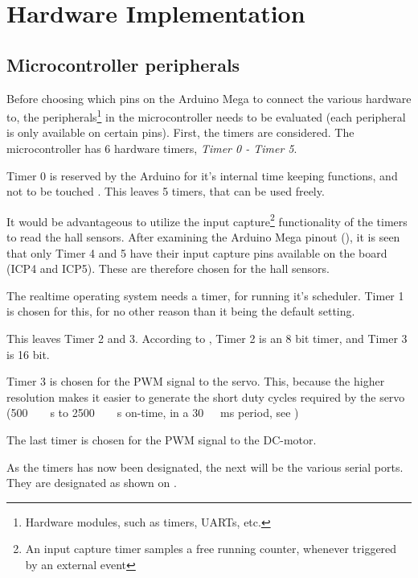 \section{Hardware Implementation}
\subsection{Microcontroller peripherals}
Before choosing which pins on the Arduino Mega to connect the various hardware to, the peripherals\footnote{Hardware modules, such as timers, UARTs, etc.} in the microcontroller needs to be evaluated (each peripheral is only available on certain pins). First, the timers are considered. The microcontroller has 6 hardware timers, \emph{Timer 0 - Timer 5}.

Timer 0 is reserved by the Arduino for it's internal time keeping functions, and not to be touched \cite{ArduinoPWM}. This leaves 5 timers, that can be used freely.

It would be advantageous to utilize the input capture\footnote{An input capture timer samples a free running counter, whenever triggered by  an external event} functionality of the timers to read the hall sensors. After examining the Arduino Mega pinout (), it is seen that only Timer 4 and 5 have their input capture pins available on the board (ICP4 and ICP5). These are therefore chosen for the hall sensors.
   
The realtime operating system needs a timer, for running it's scheduler. Timer 1 is chosen for this, for no other reason than it being the default setting.

This leaves Timer 2 and 3. According to \cite{Atmega}, Timer 2 is an 8 bit timer, and Timer 3 is 16 bit. 

Timer 3 is chosen for the PWM signal to the servo. This, because the higher resolution makes it easier to generate the short duty cycles required by the servo (\si{500\ \mu s} to \si{2500\ \mu s} on-time, in a \si{30\ ms} period, see )

The last timer is chosen for the PWM signal to the DC-motor.

As the timers has now been designated, the next will be the various serial ports. They are designated as shown on .



